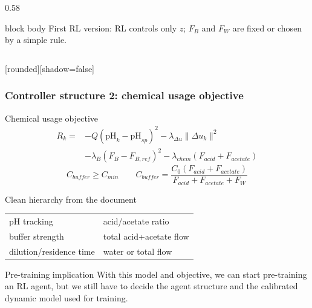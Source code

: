\documentclass[aspectratio=169]{beamer}
\newcommand{\FW}{F_W}
\newcommand{\pH}{\mathrm{pH}}
\begin{document}
\begin{frame}
\begin{columns}[T,onlytextwidth]
\begin{column}{0.58\textwidth}
\vspace{0.20cm}
\begin{beamercolorbox}[rounded=true,center,sep=4pt,wd=0.92\linewidth]{block body}
First RL version: RL controls only $z$; $F_B$ and $\FW$ are fixed or chosen by a simple rule.
\end{beamercolorbox}
\end{column}
\end{columns}
\end{frame}

\begin{frame}
[rounded][shadow=false]
\frametitle{\large \textbf{Controller structure 2: chemical usage objective}}
\scriptsize

\vspace{-0.12cm}
\begin{block}{Chemical usage objective}
\vspace{-0.12cm}
\[
  \begin{aligned}
  R_k =&
  -Q(\pH_k-\pH_{sp})^2
  -\lambda_{\Delta u}\|\Delta u_k\|^2\\
  &-\lambda_B(F_B-F_{B,ref})^2
  -\lambda_{chem}(F_{acid}+F_{acetate})
  \end{aligned}
\]
\vspace{-0.18cm}
\[
  C_{buffer}\ge C_{min}
  \qquad
  C_{buffer}=
  \frac{C_0(F_{acid}+F_{acetate})}{F_{acid}+F_{acetate}+\FW}
\]
\vspace{-0.16cm}
\end{block}

\vspace{0.04cm}
\begin{block}{Clean hierarchy from the document}
\renewcommand{\arraystretch}{1.18}
\centering
\begin{tabular}{@{}l@{\quad$\rightarrow$\quad}l@{}}
pH tracking & acid/acetate ratio\\
buffer strength & total acid+acetate flow\\
dilution/residence time & water or total flow\\
\end{tabular}
\end{block}

\vspace{0.04cm}
\begin{block}{Pre-training implication}
\justifying
With this model and objective, we can start pre-training an RL agent, but we still have to decide the agent structure and the calibrated dynamic model used for training.
\end{block}
\end{frame}
\end{document}

